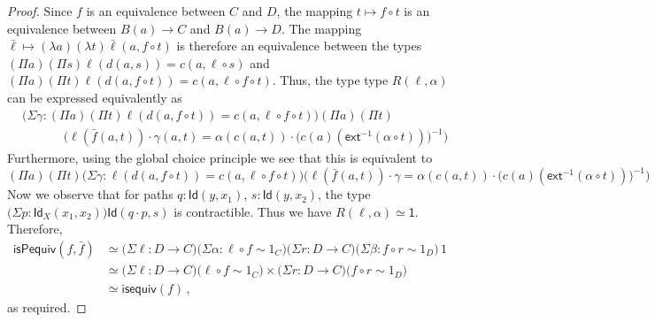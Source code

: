 \documentclass[10pt,a4paper,oneside,reqno]{amsart}
\numberwithin{equation}{section}
\theoremstyle{mythm}
\theoremstyle{mydef}
\theoremstyle{myrmk}
\newcommand{\co}{\colon}
\newcommand{\comp}{\circ}
\newcommand{\isequiv}{\mathsf{isequiv}}
\newcommand{\ext}{\mathsf{ext}}
\newcommand{\ct}{\cdot}
\newcommand{\Id}{\mathsf{Id}}
\newcommand{\one}{\mathsf{1}}
\begin{document}
\begin{proof}
Since $f$ is an equivalence between $C$ and $D$, the mapping $t \mapsto f \comp t$ is an equivalence between $B(a) \to C$ and $B(a) \to D$. The mapping $\bar{\ell} \mapsto (\lambda a) (\lambda t) \bar{\ell}(a,f \comp t)$ is therefore an equivalence between the types $(\Pi a) (\Pi s) \ell(d(a,s)) = c(a,\ell \comp s)$ and $(\Pi a) (\Pi t) \ell(d(a,f \comp t)) = c(a,\ell \comp f \comp t)$. Thus, the type type $R(\ell,\alpha)$ can be expressed equivalently as
\begin{align*}
& \big(\Sigma \gamma : (\Pi a) (\Pi t) \ell(d(a,f \circ t))=c(a,\ell \circ f \circ t)\big) (\Pi a) (\Pi t) \\ & \;\;\;\;\;\;\;\;\;\;\;\; \Big(\ell(\bar{f}(a,t)) \ct \gamma(a,t) = \alpha(c(a,t)) \ct \big(c(a)(\ext^{-1}(\alpha \circ t))\big)^{-1}\Big)
\end{align*}
Furthermore, using the global choice principle we see that this is equivalent to
\[ (\Pi a) (\Pi t) \big(\Sigma \gamma : \ell(d(a,f \circ t))=c(a,\ell \circ f \circ t)\big) \Big(\ell(\bar{f}(a,t)) \ct \gamma = \alpha(c(a,t)) \ct \big(c(a)(\ext^{-1}(\alpha \circ t))\big)^{-1}\Big) \]
Now we observe that for paths $q : \Id(y,x_1)$, $s : \Id(y,x_2)$, the type $\big(\Sigma p : \Id_X(x_1,x_2)\big) \Id(q \ct p,s)$ is contractible. Thus we have $R(\ell,\alpha) \simeq \one$. Therefore,
\begin{align*} 
\mathsf{isPequiv}(f,\bar{f}) 
  & \simeq   \big(\Sigma \ell \co D \to C \big) \big(\Sigma \alpha : \ell \comp f \sim 1_C \big) \big(\Sigma r  \co D \to C \big) 
 \big(\Sigma \beta \co f \comp r \sim 1_D \big) \, 1 \\
 & \simeq \big(\Sigma \ell \co D \to C \big)  \big( \ell \comp f \sim 1_C \big) \times 
 \big(\Sigma r  \co D \to C \big) \big( f \comp r \sim 1_D \big) \\
 & \simeq \isequiv(f) \, ,
\end{align*} 
as required.
\end{proof}
\end{document}

